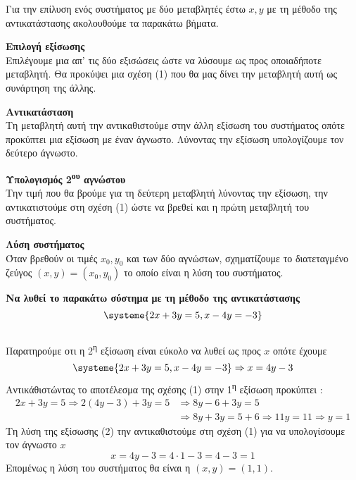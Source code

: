 \documentclass[twoside,nofonts,internet,methodoi]{thewria}
\newcommand{\tss}[1]{\textsuperscript{#1}}
\begin{document}
\begin{Methodos}
Για την επίλυση ενός συστήματος με δύο μεταβλητές έστω $ x,y $ με τη μέθοδο της αντικατάστασης ακολουθούμε τα παρακάτω βήματα.
\begin{bhma}
\item \textbf{Επιλογή εξίσωσης}\\
Επιλέγουμε μια απ' τις δύο εξισώσεις ώστε να λύσουμε ως προς οποιαδήποτε μεταβλητή. Θα προκύψει μια σχέση (1) που θα μας δίνει την μεταβλητή αυτή ως συνάρτηση της άλλης. 
\item \textbf{Αντικατάσταση}\\
Τη μεταβλητή αυτή την αντικαθιστούμε στην άλλη εξίσωση του συστήματος οπότε προκύπτει μια εξίσωση με έναν άγνωστο. Λύνοντας την εξίσωση υπολογίζουμε τον δεύτερο άγνωστο.
\item \textbf{Υπολογισμός 2\tss{ου} αγνώστου}\\
Την τιμή που θα βρούμε για τη δεύτερη μεταβλητή λύνοντας την εξίσωση, την αντικατιστούμε στη σχέση (1) ώστε να βρεθεί και η πρώτη μεταβλητή του συστήματος.
\item \textbf{Λύση συστήματος}\\
Όταν βρεθούν οι τιμές $ x_0,y_0 $ και των δύο αγνώστων, σχηματίζουμε το διατεταγμένο ζεύγος $ (x,y)=(x_0,y_0) $ το οποίο είναι η λύση του συστήματος.
\end{bhma}
\end{Methodos}
\textbf{Να λυθεί το παρακάτω σύστημα με τη μέθοδο της αντικατάστασης}
{\boldmath\[ \systeme{2x+3y=5,x-4y=-3} \]}
\lysh\\
Παρατηρούμε οτι η 2\tss{η} εξίσωση είναι εύκολο να λυθεί ως προς $ x $ οπότε έχουμε
\begin{equation}
\systeme{2x+3y=5,x-4y=-3}\Rightarrow x=4y-3
\end{equation}
Αντικάθιστώντας το αποτέλεσμα της σχέσης (1) στην 1\tss{η} εξίσωση προκύπτει :
\begin{equation}\begin{aligned}
2x+3y=5\Rightarrow 2(4y-3)+3y=5&\Rightarrow 8y-6+3y=5\\&\Rightarrow 8y+3y=5+6\Rightarrow 11y=11\Rightarrow y=1\end{aligned}
\end{equation}
Τη λύση της εξίσωσης (2) την αντικαθιστούμε στη σχέση (1) για να υπολογίσουμε τον άγνωστο $ x $
\[ x=4y-3=4\cdot1-3=4-3=1 \]
Επομένως η λύση του συστήματος θα είναι η $ (x,y)=(1,1) $.
\end{document}
